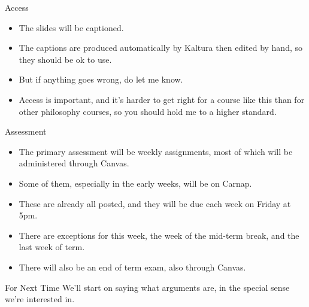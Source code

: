 \documentclass[
  ignorenonframetext,
]{beamer}
\providecommand{\tightlist}{%
  \setlength{\itemsep}{0pt}\setlength{\parskip}{0pt}}
\renewcommand{\,}{\text{, }}
\begin{document}
\begin{frame}{Access}
\protect\hypertarget{access}{}
\begin{itemize}
\tightlist
\item
  The slides will be captioned.
\item
  The captions are produced automatically by Kaltura then edited by
  hand, so they should be ok to use.
\item
  But if anything goes wrong, do let me know.
\item
  Access is important, and it's harder to get right for a course like
  this than for other philosophy courses, so you should hold me to a
  higher standard.
\end{itemize}
\end{frame}

\begin{frame}{Assessment}
\protect\hypertarget{assessment}{}
\begin{itemize}
\tightlist
\item
  The primary assessment will be weekly assignments, most of which will
  be administered through Canvas.
\item
  Some of them, especially in the early weeks, will be on Carnap.
\item
  These are already all posted, and they will be due each week on Friday
  at 5pm.
\item
  There are exceptions for this week, the week of the mid-term break,
  and the last week of term.
\item
  There will also be an end of term exam, also through Canvas.
\end{itemize}
\end{frame}

\begin{frame}{For Next Time}
\protect\hypertarget{for-next-time}{}
We'll start on saying what arguments are, in the special sense we're
interested in.
\end{frame}
\end{document}
